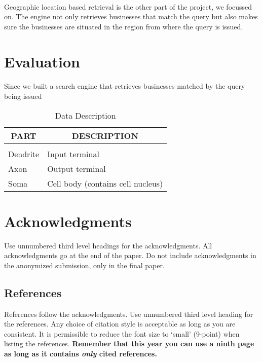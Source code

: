 \documentclass{article} %
\begin{document}
\paragraph{}Geographic location based retrieval is the other part of the project, we focussed on. The engine not only retrieves businesses that match the query but also makes sure the businesses are situated in the region from where the query is issued. 
\section{Evaluation}
\paragraph{}Since we built a search engine that retrieves businesses matched by the query being issued

\begin{table}[t]
\caption{Data Description}
\label{sample-table}
\begin{center}
\begin{tabular}{ll}
\multicolumn{1}{c}{\bf PART}  &\multicolumn{1}{c}{\bf DESCRIPTION}
\\ \hline \\
Dendrite         &Input terminal \\
Axon             &Output terminal \\
Soma             &Cell body (contains cell nucleus) \\
\end{tabular}
\end{center}
\end{table}


\section*{Acknowledgments}

Use unnumbered third level headings for the acknowledgments. All
acknowledgments go at the end of the paper. Do not include 
acknowledgments in the anonymized submission, only in the 
final paper. 

\subsection*{References}

References follow the acknowledgments. Use unnumbered third level heading for
the references. Any choice of citation style is acceptable as long as you are
consistent. It is permissible to reduce the font size to `small' (9-point) 
when listing the references. {\bf Remember that this year you can use
a ninth page as long as it contains \emph{only} cited references.}
\end{document}
